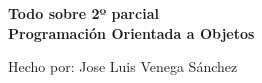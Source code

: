 \thispagestyle{empty}
\begin{center}
\vspace*{\fill}
	\textbf{\huge \vspace*{0.1in} Todo sobre 2º parcial\\ Programación Orientada a Objetos}
\vspace*{\fill}

\vspace{1in}
Hecho por: Jose Luis Venega Sánchez
\end{center}
